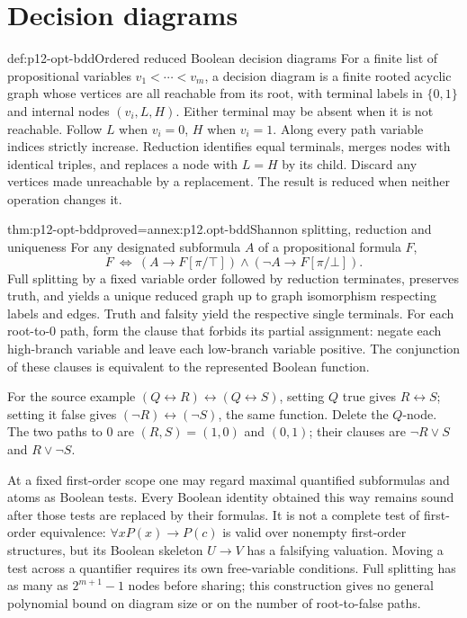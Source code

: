 \section{Decision diagrams}
\begin{hbdefinition}{def:p12-opt-bdd}{Ordered reduced Boolean decision diagrams}
For a finite list of propositional variables
\(v_1<\cdots<v_m\), a decision diagram is a finite rooted acyclic
graph whose vertices are all reachable from its root, with terminal
labels in \(\{0,1\}\) and internal nodes \((v_i,L,H)\).
Either terminal may be absent when it is not reachable.
Follow \(L\) when \(v_i=0\), \(H\) when \(v_i=1\).
Along every path variable indices strictly increase.
Reduction identifies equal terminals, merges nodes with identical
triples, and replaces a node with \(L=H\) by its child.
Discard any vertices made unreachable by a replacement.
The result is reduced when neither operation changes it.
\end{hbdefinition}

\begin{hbtheorem}{thm:p12-opt-bdd}{proved=annex:p12.opt-bdd}{Shannon splitting, reduction and uniqueness}
For any designated subformula \(A\) of a propositional formula \(F\),
\[
 F\ \Leftrightarrow\
 (A\to F[\pi/\top])\land(\neg A\to F[\pi/\bot]).
\]
Full splitting by a fixed variable order followed by reduction
terminates, preserves truth, and yields a unique reduced graph
up to graph isomorphism respecting labels and edges.
Truth and falsity yield the respective single terminals.
For each root-to-\(0\) path, form the clause that forbids its partial
assignment: negate each high-branch variable and leave each
low-branch variable positive. The conjunction of these clauses is
equivalent to the represented Boolean function.
\end{hbtheorem}

For the source example \((Q\leftrightarrow R)\leftrightarrow
(Q\leftrightarrow S)\), setting \(Q\) true gives
\(R\leftrightarrow S\); setting it false gives
\((\neg R)\leftrightarrow(\neg S)\), the same function.
Delete the \(Q\)-node. The two paths to \(0\) are
\((R,S)=(1,0)\) and \((0,1)\); their clauses are
\(\neg R\lor S\) and \(R\lor\neg S\).

At a fixed first-order scope one may regard maximal quantified
subformulas and atoms as Boolean tests. Every Boolean identity
obtained this way remains sound after those tests are replaced
by their formulas. It is not a complete test of first-order
equivalence: \(\forall xP(x)\to P(c)\) is valid over nonempty
first-order structures, but its Boolean skeleton \(U\to V\)
has a falsifying valuation. Moving a test across a quantifier
requires its own free-variable conditions.
Full splitting has as many as \(2^{m+1}-1\) nodes before sharing;
this construction gives no general polynomial bound on diagram
size or on the number of root-to-false paths.

